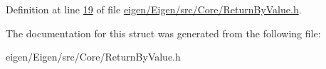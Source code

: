 Definition at line \hyperlink{eigen_2_eigen_2src_2_core_2_return_by_value_8h_source_l00019}{19} of file \hyperlink{eigen_2_eigen_2src_2_core_2_return_by_value_8h_source}{eigen/\+Eigen/src/\+Core/\+Return\+By\+Value.\+h}.



The documentation for this struct was generated from the following file\+:\begin{DoxyCompactItemize}
\item 
eigen/\+Eigen/src/\+Core/\+Return\+By\+Value.\+h\end{DoxyCompactItemize}

